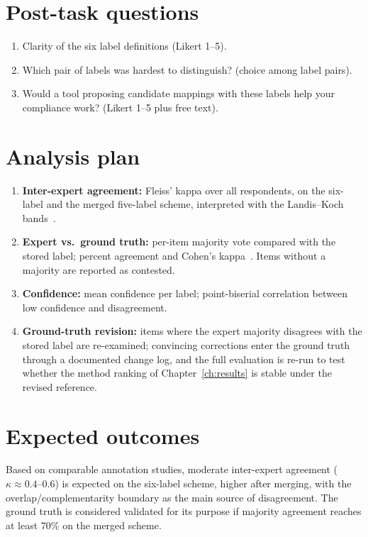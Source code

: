 \section{Post-task questions}

\begin{enumerate}[label=P\arabic*.]
  \item Clarity of the six label definitions (Likert 1--5).
  \item Which pair of labels was hardest to distinguish? (choice among label
  pairs).
  \item Would a tool proposing candidate mappings with these labels help
  your compliance work? (Likert 1--5 plus free text).
\end{enumerate}

\section{Analysis plan}

\begin{enumerate}
  \item \textbf{Inter-expert agreement:} Fleiss' kappa over all respondents,
  on the six-label and the merged five-label scheme, interpreted with the
  Landis--Koch bands~\cite{landis1977kappa}.
  \item \textbf{Expert vs.\ ground truth:} per-item majority vote compared
  with the stored label; percent agreement and Cohen's
  kappa~\cite{cohen1960kappa}. Items without a majority are reported as
  contested.
  \item \textbf{Confidence:} mean confidence per label; point-biserial
  correlation between low confidence and disagreement.
  \item \textbf{Ground-truth revision:} items where the expert majority
  disagrees with the stored label are re-examined; convincing corrections
  enter the ground truth through a documented change log, and the full
  evaluation is re-run to test whether the method ranking of
  Chapter~\ref{ch:results} is stable under the revised reference.
\end{enumerate}

\section{Expected outcomes}

Based on comparable annotation studies, moderate inter-expert agreement
($\kappa \approx 0.4$--$0.6$) is expected on the six-label scheme, higher
after merging, with the overlap/complementarity boundary as the main source
of disagreement. The ground truth is considered validated for its purpose if
majority agreement reaches at least 70\% on the merged scheme.
